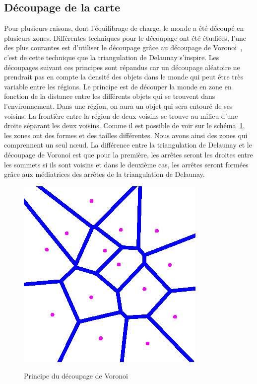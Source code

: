 	\subsection{Découpage de la carte}
	Pour plusieurs raisons, dont l'équilibrage de charge, le monde a été découpé en plusieurs zones. Différentes techniques pour le découpage ont été étudiées, l'une des plus courantes est d'utiliser le découpage grâce au découpage de Voronoi~\cite{1016552}, c'est de cette technique que la triangulation de Delaunay s'inspire. Les découpages suivant ces principes sont répandus car un découpage aléatoire ne prendrait pas en compte la densité des objets dans le monde qui peut être très variable entre les régions. Le principe est de découper la monde en zone en fonction de la distance entre les différents objets qui se trouvent dans l'environnement. Dans une région, on aura un objet qui sera entouré de ses voisins. La frontière entre la région de deux voisins se trouve au milieu d'une droite séparant les deux voisins. Comme il est possible de voir sur le schéma~\ref{Voronoi}, les zones ont des formes et des tailles différentes. Nous avons ainsi des zones qui comprennent un seul nœud. La différence entre la triangulation de Delaunay et le découpage de Voronoi est que pour la première, les arrêtes seront les droites entre les sommets si ils sont voisins et dans le deuxième cas, les arrêtes seront formées grâce aux médiatrices des arrêtes de la triangulation de Delaunay.\\ 
	\vspace{5mm}
        \begin{figure}[!h]
        \centering
        \includegraphics[scale=0.45]{./Ressources/Images/voronoi.png}\\
        \caption{Principe du découpage de Voronoi}
        \label{Voronoi}
        \end{figure}
        \vspace{5mm}

